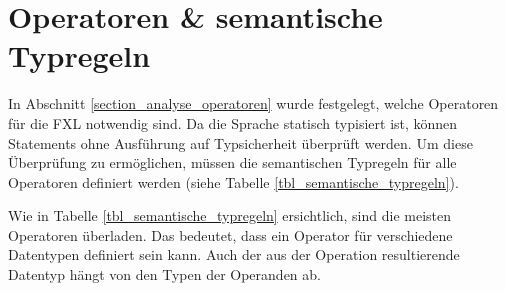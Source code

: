 \section{Operatoren \& semantische Typregeln}

In Abschnitt \ref{section_analyse_operatoren} wurde festgelegt, welche Operatoren für die FXL not\-wen\-dig sind. Da die Sprache statisch typisiert ist, können Statements ohne Aus\-führ\-ung auf Typsicherheit überprüft werden. Um diese Überprüfung zu ermöglichen, müssen die semantischen Typregeln für alle Operatoren definiert werden (siehe Tabelle \ref{tbl_semantische_typregeln}).

Wie in Tabelle \ref{tbl_semantische_typregeln} ersichtlich, sind die meisten Operatoren überladen. Das bedeutet, dass ein Operator für verschiedene Datentypen definiert sein kann. Auch der aus der Operation resultierende Datentyp hängt von den Typen der Operanden ab. 

